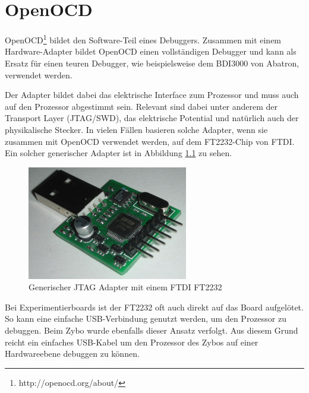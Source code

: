 \chapter{OpenOCD}
OpenOCD\footnote{http://openocd.org/about/} bildet den Software-Teil eines Debuggers.
Zusammen mit einem Hardware-Adapter bildet OpenOCD einen vollständigen Debugger und kann als Ersatz für einen teuren Debugger, wie beispielsweise dem BDI3000 von Abatron, verwendet werden.

Der Adapter bildet dabei das elektrische Interface zum Prozessor und muss auch auf den Prozessor abgestimmt sein.
Relevant sind dabei unter anderem der Transport Layer (JTAG/SWD), das elektrische Potential und natürlich auch der physikalische Stecker.
In vielen Fällen basieren solche Adapter, wenn sie zusammen mit OpenOCD verwendet werden, auf dem FT2232-Chip von FTDI.
Ein solcher generischer Adapter ist in Abbildung \ref{fig:GenerischerFT2232Adapter} zu sehen.

\begin{figure}[htbp]
	\centering
		\includegraphics[width=7cm,keepaspectratio]{images/JTAGAdapter.jpg}
	\caption[Generischer JTAG Adapter mit einem FTDI FT2232]{Generischer JTAG Adapter mit einem FTDI FT2232\footnotemark}
	\label{fig:GenerischerFT2232Adapter}
\end{figure}

Bei Experimentierboards ist der FT2232 oft auch direkt auf das Board aufgelötet.
So kann eine einfache USB-Verbindung genutzt werden, um den Prozessor zu debuggen.
Beim Zybo wurde ebenfalls dieser Ansatz verfolgt.
Aus diesem Grund reicht ein einfaches USB-Kabel um den Prozessor des Zybos auf einer Hardwareebene debuggen zu können.



